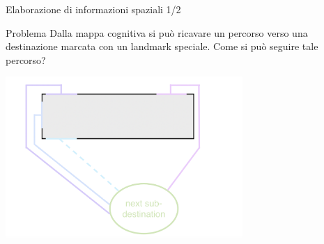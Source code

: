 \documentclass{beamer}
\begin{document}
{}

\begin{frame}{Elaborazione di informazioni spaziali 1/2}
\begin{alertblock}{Problema}
Dalla mappa cognitiva si può ricavare un percorso verso una destinazione marcata con un landmark speciale. Come si può seguire tale percorso?
\end{alertblock}{}
\hfil\hfil\includegraphics[width=9cm]{figures/polygonal-chains-to-subdestination.png}
\end{frame}{}
\end{document}
